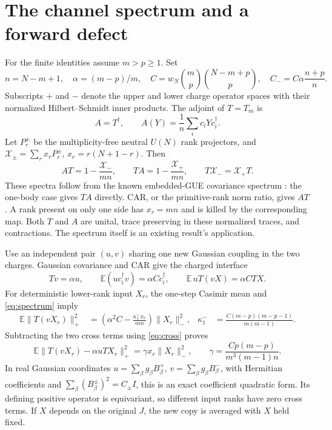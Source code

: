 \documentclass[11pt,a4paper]{article}
\newcommand{\EE}{\mathbb E}
\newcommand{\XX}{\mathcal X}
\begin{document}
\newpage
\section{The channel spectrum and a forward defect}
For the finite identities assume $m>p\ge1$. Set
\begin{equation}
 n=N-m+1,\quad \alpha=(m-p)/m,\quad
 C=w_N\binom mp\binom{N-m+p}p,\quad
 C_-=C\alpha\frac{n+p}{n}.
\end{equation}
Subscripts $+$ and $-$ denote the upper and lower charge operator
spaces with their normalized Hilbert--Schmidt inner products. The
adjoint of $T=T_m$ is
\begin{equation}
 A=T^\dagger,\qquad A(Y)=\frac1n\sum_i c_iYc_i^\dagger.
\end{equation}
Let $P_r^\pm$ be the multiplicity-free neutral $U(N)$ rank projectors,
and $\XX_\pm=\sum_r x_rP_r^\pm$, $x_r=r(N+1-r)$. Then
\begin{equation}
 AT=1-\frac{\XX_-}{mn},\qquad
 TA=1-\frac{\XX_+}{mn},\qquad T\XX_-=\XX_+T.
 \label{eq:spectrum}
\end{equation}
These spectra follow from the known embedded-GUE covariance spectrum
\cite{Kota}: the one-body case gives $TA$ directly. CAR, or the
primitive-rank norm ratio, gives $AT$. A rank present on only one
side has $x_r=mn$ and is killed by the corresponding map. Both
$T$ and $A$ are unital, trace preserving in these normalized traces,
and contractions. The spectrum itself is an existing result's application.

Use an independent pair $(u,v)$ sharing one new Gaussian coupling
in the two charges. Gaussian covariance and CAR give the charged interface
\begin{equation}
 Tv=\alpha u,\qquad \EE(uc_i^\dagger v)=\alpha Cc_i^\dagger,
 \qquad \EE\,uT(vX)=\alpha C TX.
 \label{eq:cross}
\end{equation}
For deterministic lower-rank input $X_r$, the one-step Casimir mean
and \eqref{eq:spectrum} imply
\begin{align}
 \EE\|T(vX_r)\|_+^2
 &=\left(\alpha^2C-\frac{\kappa_1^-x_r}{mn}\right)\|X_r\|_-^2,
 &\kappa_1^-&=\frac{C(m-p)(m-p-1)}{m(m-1)}.
\end{align}
Subtracting the two cross terms using \eqref{eq:cross} proves
\begin{equation}
 \boxed{\ \EE\|T(vX_r)-\alpha uTX_r\|_+^2
 =\gamma x_r\|X_r\|_-^2,\qquad
 \gamma=\frac{Cp(m-p)}{m^3(m-1)n}.\ }
 \label{eq:forward}
\end{equation}
In real Gaussian coordinates $u=\sum_\beta g_\beta B_\beta^+$,
$v=\sum_\beta g_\beta B_\beta^-$, with Hermitian coefficients and
$\sum_\beta(B_\beta^\pm)^2=C_\pm I$, this is an exact coefficient
quadratic form. Its defining positive operator is equivariant, so
different input ranks have zero cross terms. If $X$ depends on the
original $J$, the new copy is averaged with $X$ held fixed.
\end{document}
